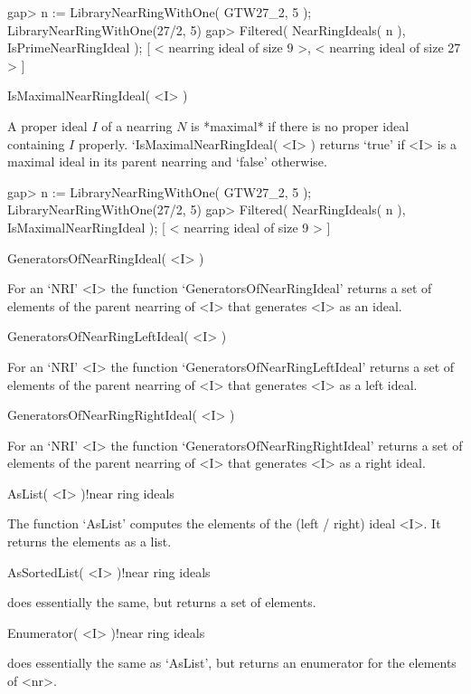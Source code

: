 \beginexample
    gap> n := LibraryNearRingWithOne( GTW27_2, 5 );
    LibraryNearRingWithOne(27/2, 5)
    gap> Filtered( NearRingIdeals( n ), IsPrimeNearRingIdeal );
    [ < nearring ideal of size 9 >, < nearring ideal of size 27 > ]
\endexample

\>IsMaximalNearRingIdeal( <I> )

A proper ideal $I$ of a nearring $N$ is *maximal* if there is no
proper ideal containing $I$ properly.
`IsMaximal\-NearRingIdeal( <I> ) returns `true' if <I> is a
maximal ideal in its parent nearring and `false' otherwise.

\beginexample
    gap> n := LibraryNearRingWithOne( GTW27_2, 5 );
    LibraryNearRingWithOne(27/2, 5)
    gap> Filtered( NearRingIdeals( n ), IsMaximalNearRingIdeal );
    [ < nearring ideal of size 9 > ]
\endexample



\>GeneratorsOfNearRingIdeal( <I> )

For an `NRI' <I> the function `GeneratorsOfNearRingIdeal'
returns a set of elements of the parent nearring of <I> that generates <I>
as an ideal.

\>GeneratorsOfNearRingLeftIdeal( <I> )

For an `NRI' <I> the function `GeneratorsOfNearRingLeftIdeal'
returns a set of elements of the parent nearring of <I> that generates <I>
as a left ideal.

\>GeneratorsOfNearRingRightIdeal( <I> )

For an `NRI' <I> the function `GeneratorsOfNearRingRightIdeal'
returns a set of elements of the parent nearring of <I> that generates <I>
as a right ideal.



\>AsList( <I> )!{near ring ideals}

The function `AsList' computes the elements of the (left / right) ideal <I>.
It returns the elements as a list.

\>AsSortedList( <I> )!{near ring ideals}

does essentially the same, but returns a set of elements.

\>Enumerator( <I> )!{near ring ideals}

does essentially the same as `AsList', but returns an enumerator for the
elements of <nr>.

